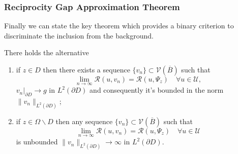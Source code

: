 \documentclass[10pt,xcolor={dvipsnames}]{beamer}
\theoremstyle{plain}
\theoremstyle{plain}
\begin{document}
\begin{frame}
 \frametitle{Reciprocity Gap Approximation Theorem}
 Finally we can state the key theorem which provides a binary criterion to discriminate the inclusion from the background.
\begin{theorem}
 \label{theo:approximation-rg} 
There holds the alternative
 \begin{enumerate}
  \item if $z \in D$ then there exists a sequence $\{v_n\} \subset \mathcal{V}(\overline{B})$ such that
   \begin{equation}
     \lim_{n\to\infty}\mathcal{R}(u,v_n) = \mathcal{R}(u,\Psi_z)\quad\forall u\in\mathcal{U},\label{eq:rg-lim-constructive}
   \end{equation}
   $v_n|_{\partial D}\to g$ in $L^2(\partial D)$ and consequently  it's bounded in the norm $\|v_n\|_{L^2(\partial D)}$;
  \item if $z \in \Omega \backslash D$ then any sequence $\{v_n\} \subset \mathcal{V}(\overline{B})$ such that
   \begin{equation}
     \lim_{n\to\infty}\mathcal{R}(u,v_n) = \mathcal{R}(u,\Psi_z)\quad\forall u\in\mathcal{U}\label{eq:rg-lim-counterpart}
   \end{equation}
   is unbounded $\|v_n\|_{L^2(\partial D)}\to\infty$ in $L^2(\partial D)$.
 \end{enumerate}
\end{theorem}
\end{frame}
\end{document}
